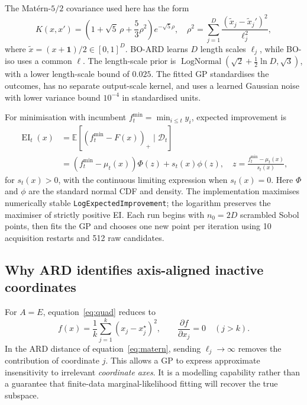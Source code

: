 \documentclass[11pt,a4paper]{article}
\newcommand{\E}{\mathbb{E}}
\begin{document}
The Mat\'ern-$5/2$ covariance used here has the form
\begin{equation}\label{eq:matern}
K(x,x')=\left(1+\sqrt5\,\rho+\frac53\rho^2\right)e^{-\sqrt5\rho},\quad
\rho^2=\sum_{j=1}^D\frac{(\tilde x_j-\tilde x_j')^2}{\ell_j^2},
\end{equation}
where $\tilde x=(x+\mathbf1)/2\in[0,1]^D$. BO-ARD learns $D$ length scales $\ell_j$, while BO-iso uses a common $\ell$. The length-scale prior is $\operatorname{LogNormal}(\sqrt2+\tfrac12\ln D,\sqrt3)$, with a lower length-scale bound of $0.025$. The fitted GP standardises the outcomes, has no separate output-scale kernel, and uses a learned Gaussian noise with lower variance bound $10^{-4}$ in standardised units.

For minimisation with incumbent $f_t^{\min}=\min_{i\le t}y_i$, expected improvement is
\begin{align}
\operatorname{EI}_t(x)&=\E[(f_t^{\min}-F(x))_+\mid\mathcal D_t]\\
&=(f_t^{\min}-\mu_t(x))\Phi(z)+s_t(x)\phi(z),\quad z=\frac{f_t^{\min}-\mu_t(x)}{s_t(x)},
\end{align}
for $s_t(x)>0$, with the continuous limiting expression when $s_t(x)=0$. Here $\Phi$ and $\phi$ are the standard normal CDF and density. The implementation maximises numerically stable \texttt{LogExpectedImprovement}; the logarithm preserves the maximiser of strictly positive EI. Each run begins with $n_0=2D$ scrambled Sobol points, then fits the GP and chooses one new point per iteration using 10 acquisition restarts and 512 raw candidates.

\subsection{Why ARD identifies axis-aligned inactive coordinates}
For $A=E$, equation~\eqref{eq:quad} reduces to
\begin{equation}f(x)=\frac1k\sum_{j=1}^k(x_j-x_j^\star)^2,\qquad \frac{\partial f}{\partial x_j}=0\quad(j>k).\end{equation}
In the ARD distance of equation~\eqref{eq:matern}, sending $\ell_j\to\infty$ removes the contribution of coordinate $j$. This allows a GP to express approximate insensitivity to irrelevant \emph{coordinate axes}. It is a modelling capability rather than a guarantee that finite-data marginal-likelihood fitting will recover the true subspace.
\end{document}
